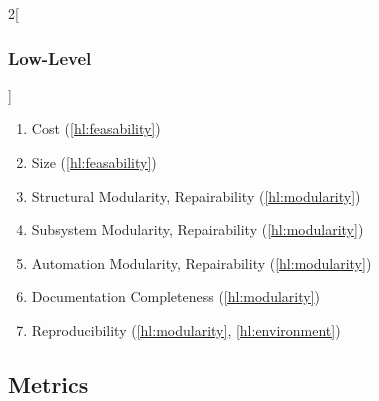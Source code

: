 \documentclass{../tex/report}
\begin{document}
\begin{multicols}{2}[\subsubsection{Low-Level}\label{sec:llos}]
\begin{enumerate}[label=LL\arabic*., ref=LL\arabic*]
        \item \label{ll:cost} Cost \hfill (\ref{hl:feasability})
        \item \label{ll:size} Size \hfill (\ref{hl:feasability})
        \item \label{ll:modularity_structural} Structural Modularity, Repairability \hfill (\ref{hl:modularity})
        \item \label{ll:modularity_subsystem} Subsystem Modularity,  Repairability \hfill (\ref{hl:modularity})
        \item \label{ll:modularity_automation} Automation Modularity, Repairability \hfill (\ref{hl:modularity})
        \item \label{ll:documentation} Documentation Completeness \hfill (\ref{hl:modularity})
        \item \label{ll:reproducibility} Reproducibility \hfill (\ref{hl:modularity}, \ref{hl:environment})
    \end{enumerate}
\end{multicols}

\clearpage

\subsection{Metrics}
\label{sec:metrics}

\renewcommand{\arraystretch}{0.9} %
\end{document}

